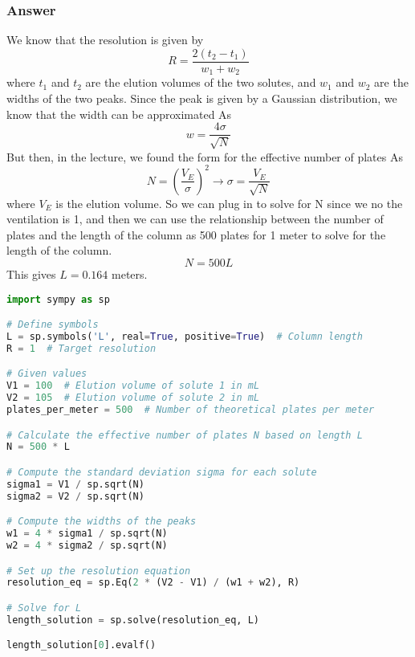 \documentclass[12pt]{article}
\begin{document}
\subsubsection{Answer}
We know that the resolution is given by
\begin{equation}
  R = \frac{2(t_{2}-t_{1})}{w_{1}+w_{2}}
\end{equation}
where $t_{1}$ and $t_{2}$ are the elution volumes of the two solutes, and $w_{1}$ and $w_{2}$ are the widths of the two peaks. Since the peak is given by a Gaussian distribution, we know that the width can be approximated As
\begin{equation}
  w = \frac{4\sigma }{\sqrt{N}}
\end{equation}
But then, in the lecture, we found the form for the effective number of plates As
\begin{equation}
  N=(\frac{V_{E}}{\sigma })^{2} \rightarrow \sigma = \frac{V_{E}}{\sqrt{N}}
\end{equation}
where $V_{E}$ is the elution volume.
So we can plug in to solve for N since we no the ventilation is 1, and then we can use the relationship between the number of plates and the length of the column as 500 plates for 1 meter to solve for the length of the column.
\begin{equation}
  N = 500L
\end{equation}
This gives $L = 0.164$ meters.
\begin{lstlisting}[language=Python]
import sympy as sp

# Define symbols
L = sp.symbols('L', real=True, positive=True)  # Column length
R = 1  # Target resolution

# Given values
V1 = 100  # Elution volume of solute 1 in mL
V2 = 105  # Elution volume of solute 2 in mL
plates_per_meter = 500  # Number of theoretical plates per meter

# Calculate the effective number of plates N based on length L
N = 500 * L

# Compute the standard deviation sigma for each solute
sigma1 = V1 / sp.sqrt(N)
sigma2 = V2 / sp.sqrt(N)

# Compute the widths of the peaks
w1 = 4 * sigma1 / sp.sqrt(N)
w2 = 4 * sigma2 / sp.sqrt(N)

# Set up the resolution equation
resolution_eq = sp.Eq(2 * (V2 - V1) / (w1 + w2), R)

# Solve for L
length_solution = sp.solve(resolution_eq, L)

length_solution[0].evalf()

\end{lstlisting}
\end{document}

